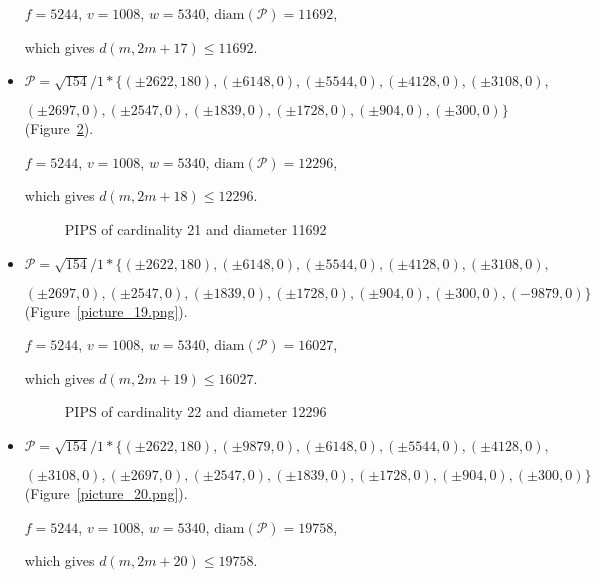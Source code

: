\documentclass[12pt]{article}
\theoremstyle{theorem}
\theoremstyle{dfn}
\theoremstyle{remark}
\begin{document}
\begin{itemize}
$f = 5244$, $v = 1008$, $w = 5340$, $\operatorname{diam(\mathcal{P})} = 11692$,

which gives $d(m, 2m + 17) \leq 11692$.


\item
$\mathcal{P}=\sqrt{154}/{1} * \{ (\pm 2622, 180),
(\pm 6148 , 0),
(\pm 5544 , 0),
(\pm 4128 , 0),
(\pm 3108 , 0),
$

$
(\pm 2697 , 0),
(\pm 2547 , 0),
(\pm 1839 , 0),
(\pm 1728 , 0),
(\pm 904 , 0),
(\pm 300 , 0)\}
$
(Figure~\ref{picture_18.png}).

$f = 5244$, $v = 1008$, $w = 5340$, $\operatorname{diam(\mathcal{P})} = 12296$,

which gives $d(m, 2m + 18) \leq 12296$.


\begin{figure}[h!]
\parbox{0.75\linewidth}{\caption{PIPS of cardinality 21 and diameter 11692}
\label{picture_17.png}}
\end{figure}


\item
$\mathcal{P}=\sqrt{154}/{1} * \{ (\pm 2622, 180),
(\pm 6148 , 0),
(\pm 5544 , 0),
(\pm 4128 , 0),
(\pm 3108 , 0),
$

$
(\pm 2697  , 0),
(\pm 2547 , 0),
(\pm 1839 , 0),
(\pm 1728 , 0),
(\pm 904 , 0),
(\pm 300 , 0),
(-9879 , 0)\}
$
(Figure~\ref{picture_19.png}).

$f = 5244$, $v = 1008$, $w = 5340$, $\operatorname{diam(\mathcal{P})} = 16027$,

which gives $d(m, 2m + 19) \leq 16027$.


\begin{figure}[h!]
\parbox{0.75\linewidth}{\caption{PIPS of cardinality 22 and diameter 12296}
\label{picture_18.png}}
\end{figure}


\item
$\mathcal{P}=\sqrt{154}/{1} * \{ (\pm 2622, 180),
(\pm 9879 , 0),
(\pm 6148 , 0),
(\pm 5544 , 0),
(\pm 4128 , 0),
$

$
(\pm 3108 , 0),
(\pm 2697 , 0),
(\pm 2547 , 0),
(\pm 1839 , 0),
(\pm 1728 , 0),
(\pm 904 , 0),
(\pm 300 , 0)\}
$
(Figure~\ref{picture_20.png}).

$f = 5244$, $v = 1008$, $w = 5340$, $\operatorname{diam(\mathcal{P})} = 19758$,

which gives $d(m, 2m + 20) \leq 19758$.



\end{itemize}
\end{document}
